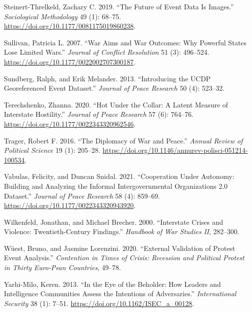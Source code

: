 \documentclass{article}
\newlength{\cslhangindent}
\newlength{\cslentryspacingunit} %
\newenvironment{CSLReferences}[2] %
 {%
  \setlength{\parindent}{0pt}
  \ifodd #1
  \let\oldpar\par
  \def\par{\hangindent=\cslhangindent\oldpar}
  \fi
  \setlength{\parskip}{#2\cslentryspacingunit}
 }%
 {}
\begin{document}
\begin{CSLReferences}{1}{0}
\leavevmode{}%
Steinert-Threlkeld, Zachary C. 2019. {``The {Future} of {Event Data Is
Images}.''} \emph{Sociological Methodology} 49 (1): 68--75.
\url{https://doi.org/10.1177/0081175019860238}.

\leavevmode{}%
Sullivan, Patricia L. 2007. {``War {Aims} and {War Outcomes}: {Why
Powerful States Lose Limited Wars}.''} \emph{Journal of Conflict
Resolution} 51 (3): 496--524.
\url{https://doi.org/10.1177/0022002707300187}.

\leavevmode{}%
Sundberg, Ralph, and Erik Melander. 2013. {``Introducing the {UCDP}
Georeferenced Event Dataset.''} \emph{Journal of Peace Research} 50 (4):
523--32.

\leavevmode{}%
Terechshenko, Zhanna. 2020. {``Hot Under the Collar: {A} Latent Measure
of Interstate Hostility.''} \emph{Journal of Peace Research} 57 (6):
764--76. \url{https://doi.org/10.1177/0022343320962546}.

\leavevmode{}%
Trager, Robert F. 2016. {``The {Diplomacy} of {War} and {Peace}.''}
\emph{Annual Review of Political Science} 19 (1): 205--28.
\url{https://doi.org/10.1146/annurev-polisci-051214-100534}.

\leavevmode{}%
Vabulas, Felicity, and Duncan Snidal. 2021. {``Cooperation Under
Autonomy: {Building} and Analyzing the {Informal Intergovernmental
Organizations} 2.0 Dataset.''} \emph{Journal of Peace Research} 58 (4):
859--69. \url{https://doi.org/10.1177/0022343320943920}.

\leavevmode{}%
Wilkenfeld, Jonathan, and Michael Brecher. 2000. {``Interstate Crises
and Violence: Twentieth-Century Findings.''} \emph{Handbook of War
Studies II}, 282--300.

\leavevmode{}%
Wüest, Bruno, and Jasmine Lorenzini. 2020. {``External Validation of
Protest Event Analysis.''} \emph{Contention in Times of Crisis:
Recession and Political Protest in Thirty Euro-Pean Countries}, 49--78.

\leavevmode{}%
Yarhi-Milo, Keren. 2013. {``In the {Eye} of the {Beholder}: {How
Leaders} and {Intelligence Communities Assess} the {Intentions} of
{Adversaries}.''} \emph{International Security} 38 (1): 7--51.
\url{https://doi.org/10.1162/ISEC_a_00128}.


\end{CSLReferences}
\end{document}
